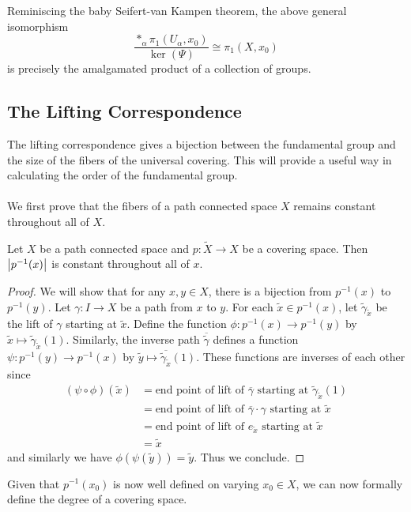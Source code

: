\documentclass[a4paper]{article}
\begin{document}
Reminiscing the baby Seifert-van Kampen theorem, the above general isomorphism $$\frac{\ast_\alpha\pi_1(U_\alpha,x_0)}{\ker(\Psi)}\cong\pi_1(X,x_0)$$ is precisely the amalgamated product of a collection of groups. 

\subsection{The Lifting Correspondence}
The lifting correspondence gives a bijection between the fundamental group and the size of the fibers of the universal covering. This will provide a useful way in calculating the order of the fundamental group. \\~\\

We first prove that the fibers of a path connected space $X$ remains constant throughout all of $X$. 

\begin{lmm}{}{} Let $X$ be a path connected space and $p:\tilde{X}\to X$ be a covering space. Then $\abs{p^{-1}(x)}$ is constant throughout all of $x$. \tcbline
\begin{proof}
We will show that for any $x,y\in X$, there is a bijection from $p^{-1}(x)$ to $p^{-1}(y)$. Let $\gamma:I\to X$ be a path from $x$ to $y$. For each $\tilde{x}\in p^{-1}(x)$, let $\tilde{\gamma}_{\tilde{x}}$ be the lift of $\gamma$ starting at $\tilde{x}$. Define the function $\phi:p^{-1}(x)\to p^{-1}(y)$ by $\tilde{x}\mapsto\tilde{\gamma}_{\tilde{x}}(1)$. Similarly, the inverse path $\overline{\tilde{\gamma}}$ defines a function $\psi:p^{-1}(y)\to p^{-1}(x)$ by $\tilde{y}\mapsto\overline{\tilde{\gamma}_{\tilde{x}}}(1)$. These functions are inverses of each other since 
\begin{align*}
(\psi\circ\phi)(\tilde{x})&=\text{end point of lift of }\overline{\gamma}\text{ starting at }\tilde{\gamma}_{\tilde{x}}(1)\\
&=\text{end point of lift of }\overline{\gamma}\cdot\gamma\text{ starting at }\tilde{x}\\
&=\text{end point of lift of }e_{\tilde{x}}\text{ starting at }\tilde{x}\\
&=\tilde{x}
\end{align*}
and similarly we have $\phi(\psi(\tilde{y}))=\tilde{y}$. Thus we conclude. 
\end{proof}
\end{lmm}

Given that $p^{-1}(x_0)$ is now well defined on varying $x_0\in X$, we can now formally define the degree of a covering space. 
\end{document}
